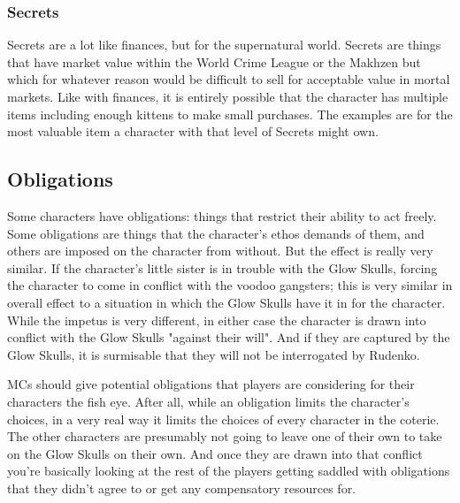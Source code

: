 \subsubsection{Secrets}

\hspace{\parindent} Secrets are a lot like finances, but for the supernatural world. Secrets are things that have market value within the World Crime League or the Makhzen but which for whatever reason would be difficult to sell for acceptable value in mortal markets. Like with finances, it is entirely possible that the character has multiple items including enough kittens to make small purchases. The examples are for the most valuable item a character with that level of Secrets might own.

\subsection{Obligations}

\hspace{\parindent} Some characters have obligations: things that restrict their ability to act freely. Some obligations are things that the character's ethos demands of them, and others are imposed on the character from without. But the effect is really very similar. If the character's little sister is in trouble with the Glow Skulls, forcing the character to come in conflict with the voodoo gangsters; this is very similar in overall effect to a situation in which the Glow Skulls have it in for the character. While the impetus is very different, in either case the character is drawn into conflict with the Glow Skulls "against their will". And if they are captured by the Glow Skulls, it is surmisable that they will not be interrogated by Rudenko.

MCs should give potential obligations that players are considering for their characters the fish eye. After all, while an obligation limits the character's choices, in a very real way it limits the choices of every character in the coterie. The other characters are presumably not going to leave one of their own to take on the Glow Skulls on their own. And once they are drawn into that conflict you're basically looking at the rest of the players getting saddled with obligations that they didn't agree to or get any compensatory resources for.

